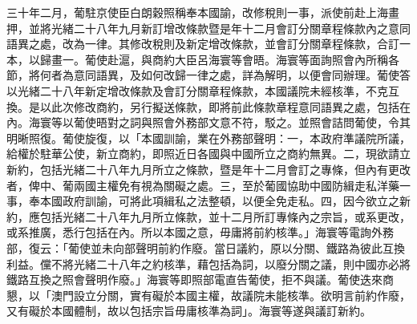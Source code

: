 \begin{pinyinscope}
三十年二月，葡駐京使臣白朗穀照稱奉本國諭，改修稅則一事，派使前赴上海畫押，並將光緒二十八年九月新訂增改條款暨是年十二月會訂分關章程條款內之意同語異之處，改為一律。其修改稅則及新定增改條款，並會訂分關章程條款，合訂一本，以歸畫一。葡使赴滬，與商約大臣呂海寰等會晤。海寰等面詢照會內所稱各節，將何者為意同語異，及如何改歸一律之處，詳為解明，以便會同辦理。葡使答以光緒二十八年新定增改條款及會訂分關章程條款，本國議院未經核準，不克互換。是以此次修改商約，另行擬送條款，即將前此條款章程意同語異之處，包括在內。海寰等以葡使晤對之詞與照會外務部文意不符，駁之。並照會詰問葡使，令其明晰照復。葡使旋復，以「本國訓諭，業在外務部聲明：一，本政府準議院所議，給權於駐華公使，新立商約，即照近日各國與中國所立之商約無異。二，現欲請立新約，包括光緒二十八年九月所立之條款，暨是年十二月會訂之專條，但內有更改者，俾中、葡兩國主權免有視為關礙之處。三，至於葡國協助中國防緝走私洋藥一事，奉本國政府訓諭，可將此項緝私之法整頓，以便全免走私。四，因今欲立之新約，應包括光緒二十八年九月所立條款，並十二月所訂專條內之宗旨，或系更改，或系推廣，悉行包括在內。所以本國之意，毋庸將前約核準。」海寰等電詢外務部，復云：「葡使並未向部聲明前約作廢。當日議約，原以分關、鐵路為彼此互換利益。儻不將光緒二十八年之約核準，藉包括為詞，以廢分關之議，則中國亦必將鐵路互換之照會聲明作廢。」海寰等即照部電直告葡使，拒不與議。葡使迭來商懇，以「澳門設立分關，實有礙於本國主權，故議院未能核準。欲明言前約作廢，又有礙於本國體制，故以包括宗旨毋庸核準為詞」。海寰等遂與議訂新約。


\end{pinyinscope}
